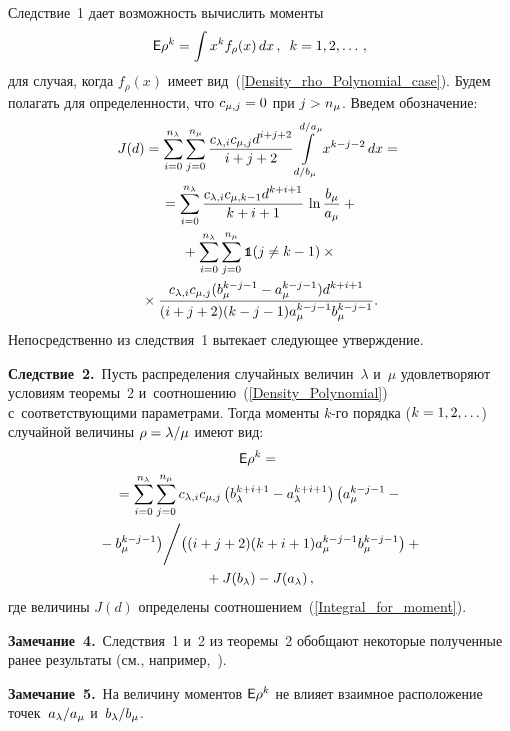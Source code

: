 \begin{multicols}{2}
\smallskip


Следствие~1 дает возможность вычислить моменты
$$
{\sf E}\rho^k=\int x^k f_\rho(x)\,dx\,, \enskip k=1,2,\ldots\,,
$$
для случая, когда $f_\rho(x)$ имеет вид~(\ref{Density_rho_Polynomial_case}). 
Будем полагать для определенности, что $c_{\mu,j}\hm=0$ при $j\hm>n_\mu$. 
Введем обозначение:
\begin{multline}
J(d)=\sum\limits_{i=0}^{n_\lambda}\sum\limits_{j=0}^{n_\mu}
\displaystyle\frac{\displaystyle c_{\lambda,i}c_{\mu,j}d^{i+j+2}\mathstrut}{\displaystyle i+j+2\mathstrut}\int\limits_{d/b_\mu}^{d/a_\mu}x^{k-j-2}\, dx={}\\
{}=
\sum\limits_{i=0}^{n_\lambda}\displaystyle\frac{\displaystyle c_{\lambda,i}c_{\mu,k-1}d^{k+i+1}\mathstrut}{\displaystyle k+i+1\mathstrut}\,
\ln\displaystyle\frac{\displaystyle b_\mu\mathstrut}{\displaystyle a_\mu\mathstrut}+{}\\
{}+\sum\limits_{i=0}^{n_\lambda}\sum\limits_{j=0}^{n_\mu}\mbox{{\small \tt {1}}\hspace{-1.3mm}{\tt 1}}(j\neq k-1)\times{}\\
{}\times
\displaystyle\frac{\displaystyle c_{\lambda,i}c_{\mu,j}(b_\mu^{k-j-1}-a_\mu^{k-j-1})d^{k+i+1}\mathstrut}{\displaystyle (i+j+2)(k-j-1)a_\mu^{k-j-1}b_\mu^{k-j-1}\mathstrut}.
\label{Integral_for_moment}
\end{multline}
Непосредственно из следствия~1 вытекает сле\-ду\-ющее утверждение.

\smallskip

\noindent
\textbf{Следствие~2.}\ Пусть распределения случайных величин~$\lambda$ и~$\mu$ 
удовлетворяют условиям теоремы~2 и~соотношению~(\ref{Density_Polynomial}) 
с~соответствующими пара\-мет\-рами. Тогда моменты $k$-го порядка ($k\hm=1,2,\ldots$) 
случайной величины $\rho\hm=\lambda/\mu$ имеют вид:
\begin{multline*}
{\sf E}\rho^k={}\\
{}=\sum\limits_{i=0}^{n_\lambda}\sum\limits_{j=0}^{n_\mu}
c_{\lambda,i}c_{\mu,j}\left(b_\lambda^{k+i+1}-a_\lambda^{k+i+1}\right)
\left(a_\mu^{k-j-1}-{}\right.\\
\left.{}-b_\mu^{k-j-1}\right)\!\Bigg/ \!
\left((i+j+2)(k+i+1)a_\mu^{k-j-1}b_\mu^{k-j-1}\right)+{}\\
{}+J(b_\lambda)-J(a_\lambda)\,,
\end{multline*}
где величины $J(d)$ определены соотношением~(\ref{Integral_for_moment}).


\smallskip

\noindent
\textbf{Замечание~4.}\ Следствия~1 и~2 из теоремы~2 обобщают некоторые 
полученные ранее результаты (см., например,~\cite{KuSh2015}).

\smallskip


\noindent
\textbf{Замечание~5.}\ На величину моментов ${\sf E}\rho^k$ не 
влияет взаимное расположение точек~$a_\lambda/a_\mu$ и~$b_\lambda/b_\mu$.


\end{multicols}
